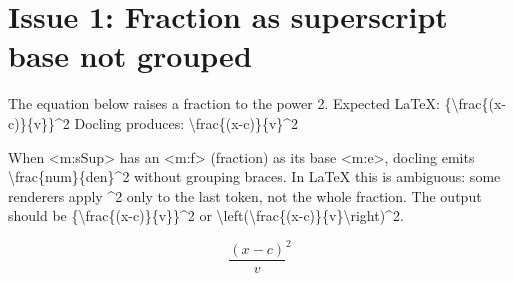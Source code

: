 \documentclass[11pt,a4paper]{article}
\begin{document}
\section{Issue 1: Fraction as superscript base not grouped}

The equation below raises a fraction to the power 2.
Expected LaTeX: \{\textbackslash{}frac\{(x-c)\}\{v\}\}\textasciicircum{}2
Docling produces: \textbackslash{}frac\{(x-c)\}\{v\}\textasciicircum{}2

When <m:sSup> has an <m:f> (fraction) as its base <m:e>, docling emits
\textbackslash{}frac\{num\}\{den\}\textasciicircum{}2 without grouping braces. In LaTeX this is ambiguous:
some renderers apply \textasciicircum{}2 only to the last token, not the whole fraction.
The output should be \{\textbackslash{}frac\{(x-c)\}\{v\}\}\textasciicircum{}2 or \textbackslash{}left(\textbackslash{}frac\{(x-c)\}\{v\}\textbackslash{}right)\textasciicircum{}2.

$${\frac{(x-c)}{v}}^{2}$$
\end{document}
